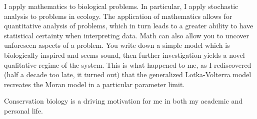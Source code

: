 \documentclass{ut-thesis}
\begin{document}
\begin{preliminary}
\begin{acknowledgements}
I apply mathematics to biological problems. In particular, I apply stochastic analysis to problems in ecology. 
The application of mathematics allows for quantitative analysis of problems, which in turn leads to a greater ability to have statistical certainty when interpreting data. 
Math can also allow you to uncover unforeseen aspects of a problem. 
You write down a simple model which is biologically inspired and seems sound, then further investigation yields a novel qualitative regime of the system. 
This is what happened to me, as I rediscovered (half a decade too late, it turned out) that the generalized Lotka-Volterra model recreates the Moran model in a particular parameter limit. 

Conservation biology is a driving motivation for me in both my academic and personal life. 

\end{acknowledgements}
\fi


\tableofcontents


\listoffigures

%

\end{preliminary}


\end{document}
